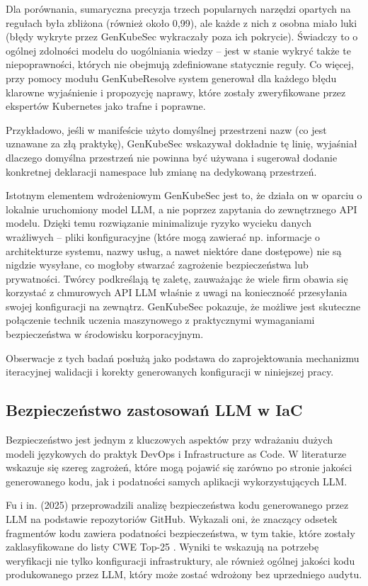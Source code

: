 Dla porównania, sumaryczna precyzja trzech popularnych narzędzi opartych na regułach była zbliżona (również około 0,99), ale każde z nich z osobna miało luki (błędy wykryte przez GenKubeSec wykraczały poza ich pokrycie). Świadczy to o ogólnej zdolności modelu do uogólniania wiedzy – jest w stanie wykryć także te niepoprawności, których nie obejmują zdefiniowane statycznie reguły. Co więcej, przy pomocy modułu GenKubeResolve system generował dla każdego błędu klarowne wyjaśnienie i propozycję naprawy, które zostały zweryfikowane przez ekspertów Kubernetes jako trafne i poprawne.

Przykładowo, jeśli w manifeście użyto domyślnej przestrzeni nazw (co jest uznawane za złą praktykę), GenKubeSec wskazywał dokładnie tę linię, wyjaśniał dlaczego domyślna przestrzeń nie powinna być używana i sugerował dodanie konkretnej deklaracji namespace lub zmianę na dedykowaną przestrzeń.

Istotnym elementem wdrożeniowym GenKubeSec jest to, że działa on w oparciu o lokalnie uruchomiony model LLM, a nie poprzez zapytania do zewnętrznego API modelu. Dzięki temu rozwiązanie minimalizuje ryzyko wycieku danych wrażliwych – pliki konfiguracyjne (które mogą zawierać np. informacje o architekturze systemu, nazwy usług, a nawet niektóre dane dostępowe) nie są nigdzie wysyłane, co mogłoby stwarzać zagrożenie bezpieczeństwa lub prywatności. Twórcy podkreślają tę zaletę, zauważając że wiele firm obawia się korzystać z chmurowych API LLM właśnie z uwagi na konieczność przesyłania swojej konfiguracji na zewnątrz. GenKubeSec pokazuje, że możliwe jest skuteczne połączenie technik uczenia maszynowego z praktycznymi wymaganiami bezpieczeństwa w środowisku korporacyjnym.

Obserwacje z tych badań posłużą jako podstawa do zaprojektowania mechanizmu iteracyjnej walidacji i korekty generowanych konfiguracji w niniejszej pracy.

\subsection{Bezpieczeństwo zastosowań LLM w IaC}

Bezpieczeństwo jest jednym z kluczowych aspektów przy wdrażaniu dużych modeli językowych do praktyk DevOps i Infrastructure as Code. W literaturze wskazuje się szereg zagrożeń, które mogą pojawić się zarówno po stronie jakości generowanego kodu, jak i podatności samych aplikacji wykorzystujących LLM.

Fu i in. (2025) \cite{fu_security_2025} przeprowadzili analizę bezpieczeństwa kodu generowanego przez LLM na podstawie repozytoriów GitHub. Wykazali oni, że znaczący odsetek fragmentów kodu zawiera podatności bezpieczeństwa, w tym takie, które zostały zaklasyfikowane do listy CWE Top-25 \cite{cwetop25}. Wyniki te wskazują na potrzebę weryfikacji nie tylko konfiguracji infrastruktury, ale również ogólnej jakości kodu produkowanego przez LLM, który może zostać wdrożony bez uprzedniego audytu.

